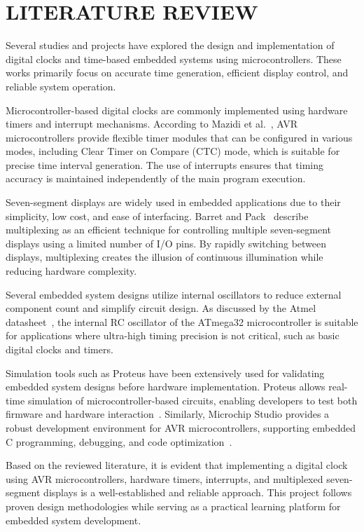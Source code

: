 \chapter{LITERATURE REVIEW}%
\label{chap:literature_review}

Several studies and projects have explored the design and implementation of digital clocks and 
time-based embedded systems using microcontrollers. These works primarily focus on accurate time 
generation, efficient display control, and reliable system operation.

Microcontroller-based digital clocks are commonly implemented using hardware timers and 
interrupt mechanisms. According to Mazidi et al.~\cite{mazidi2014avr}, AVR microcontrollers 
provide flexible timer modules that can be configured in various modes, including Clear Timer 
on Compare (CTC) mode, which is suitable for precise time interval generation. The use of 
interrupts ensures that timing accuracy is maintained independently of the main program 
execution.

Seven-segment displays are widely used in embedded applications due to their simplicity, low 
cost, and ease of interfacing. Barret and Pack~\cite{barret2012avr} describe multiplexing as an 
efficient technique for controlling multiple seven-segment displays using a limited number of 
I/O pins. By rapidly switching between displays, multiplexing creates the illusion of continuous 
illumination while reducing hardware complexity.

Several embedded system designs utilize internal oscillators to reduce external component 
count and simplify circuit design. As discussed by the Atmel datasheet~\cite{atmega32datasheet}, 
the internal RC oscillator of the ATmega32 microcontroller is suitable for applications where 
ultra-high timing precision is not critical, such as basic digital clocks and timers.

Simulation tools such as Proteus have been extensively used for validating embedded system 
designs before hardware implementation. Proteus allows real-time simulation of 
microcontroller-based circuits, enabling developers to test both firmware and hardware 
interaction~\cite{proteus}. Similarly, Microchip Studio provides a robust development 
environment for AVR microcontrollers, supporting embedded C programming, debugging, 
and code optimization~\cite{microchipstudio}.

Based on the reviewed literature, it is evident that implementing a digital clock using AVR 
microcontrollers, hardware timers, interrupts, and multiplexed seven-segment displays is a 
well-established and reliable approach. This project follows proven design methodologies while 
serving as a practical learning platform for embedded system development.
